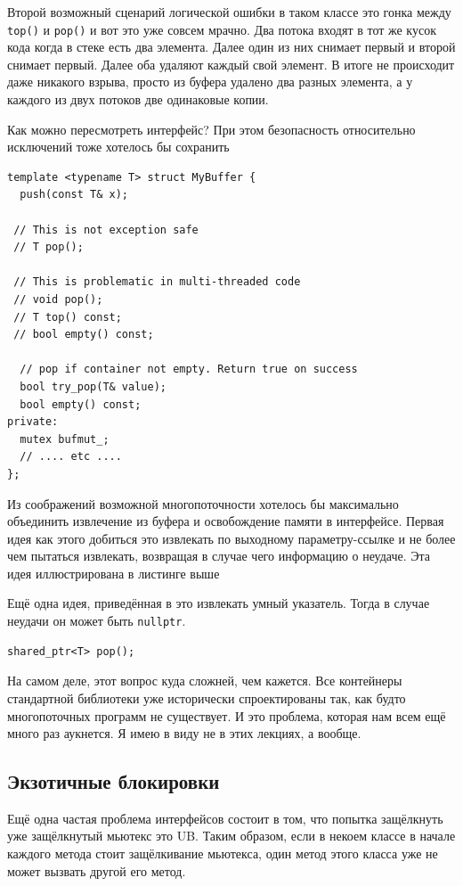 \documentclass[a4paper,12pt,oneside]{book}
\begin{document}
Второй возможный сценарий логической ошибки в таком классе это гонка между \lstinline!top()! и \lstinline!pop()! и вот это уже совсем мрачно. Два потока входят в тот же кусок кода когда в стеке есть два элемента. Далее один из них снимает первый и второй снимает первый. Далее оба удаляют каждый свой элемент. В итоге не происходит даже никакого взрыва, просто из буфера удалено два разных элемента, а у каждого из двух потоков две одинаковые копии.

Как можно пересмотреть интерфейс? При этом безопасность относительно исключений тоже хотелось бы сохранить

\begin{lstlisting}
template <typename T> struct MyBuffer {
  push(const T& x);

 // This is not exception safe
 // T pop();

 // This is problematic in multi-threaded code
 // void pop();
 // T top() const;
 // bool empty() const;

  // pop if container not empty. Return true on success
  bool try_pop(T& value);
  bool empty() const;
private:
  mutex bufmut_;
  // .... etc ....
};
\end{lstlisting}

Из соображений возможной многопоточности хотелось бы максимально объединить извлечение из буфера и освобождение памяти в интерфейсе. Первая идея как этого добиться это извлекать по выходному параметру-ссылке и не более чем пытаться извлекать, возвращая в случае чего информацию о неудаче. Эта идея иллюстрирована в листинге выше

Ещё одна идея, приведённая в \cite{williams} это извлекать умный указатель. Тогда в случае неудачи он может быть \lstinline!nullptr!.

\begin{lstlisting}
shared_ptr<T> pop();
\end{lstlisting}

На самом деле, этот вопрос куда сложней, чем кажется. Все контейнеры стандартной библиотеки уже исторически спроектированы так, как будто многопоточных программ не существует. И это проблема, которая нам всем ещё много раз аукнется. Я имею в виду не в этих лекциях, а вообще.

\subsection{Экзотичные блокировки}\label{exolocks}

Ещё одна частая проблема интерфейсов состоит в том, что попытка защёлкнуть уже защёлкнутый мьютекс это UB. Таким образом, если в некоем классе в начале каждого метода стоит защёлкивание мьютекса, один метод этого класса уже не может вызвать другой его метод.
\end{document}
